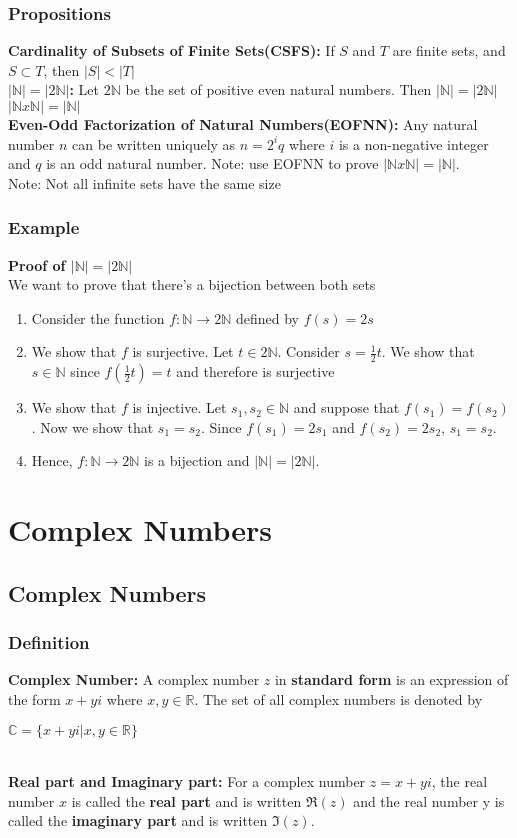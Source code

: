 \documentclass[12pt]{report}
\begin{document}
		\subsection{Propositions}
			\textbf{Cardinality of Subsets of Finite Sets(CSFS):} If $S$ and $T$ are finite sets, and $S \subset T$, then $|S| < |T|$ \\
			\textbf{$|\mathbb{N}| = |2\mathbb{N}|$:} Let $2\mathbb{N}$ be the set of positive even natural numbers. Then $|\mathbb{N}| = |2\mathbb{N}|$\\
			\textbf{$|\mathbb{N} x \mathbb{N}| = |\mathbb{N}|$}\\
			\textbf{Even-Odd Factorization of Natural Numbers(EOFNN):} Any natural number $n$ can be written uniquely as $n = 2^iq$ where $i$ is a non-negative integer and $q$ is an odd natural number.
			Note: use EOFNN to prove $|\mathbb{N} x \mathbb{N}| = |\mathbb{N}|$.\\
			Note: Not all infinite sets have the same size
		\subsection{Example}
			\textbf{Proof of $|\mathbb{N}| = |2\mathbb{N}|$}\\
			We want to prove that there's a bijection between both sets
			\begin{enumerate}
				\item Consider the function $f:\mathbb{N} \rightarrow 2\mathbb{N}$ defined by $f(s) = 2s$
				\item We show that $f$ is surjective. Let $t \in 2\mathbb{N}$. Consider $s = \frac{1}{2}t$. We show that $s \in \mathbb{N}$ since $f(\frac{1}{2}t) = t$ and therefore is surjective
				\item We show that $f$ is injective. Let $s_1, s_2 \in \mathbb{N}$ and suppose that $f(s_1) = f(s_2)$. Now we show that $s_1 = s_2$. Since $f(s_1) = 2s_1$ and $f(s_2) = 2s_2$, $s_1 = s_2$. 
				\item Hence, $f:\mathbb{N} \rightarrow 2\mathbb{N}$ is a bijection and $|\mathbb{N}| = |2\mathbb{N}|$.
			\end{enumerate}
\chapter{Complex Numbers}
	\section{Complex Numbers}
		\subsection{Definition}
			\textbf{Complex Number:} A complex number $z$ in \textbf{standard form} is an expression of the form $x+yi$ where $x,y\in \mathbb{R}$. The set of all complex numbers is denoted by\\
			\centerline{$\mathbb{C} = \{x + yi | x,y \in \mathbb{R}\}$}
			\\
			\textbf{Real part and Imaginary part:} For a complex number $z = x + yi$, the real number $x$ is called the \textbf{real part} and is written $\Re(z)$ and the real number y is called the \textbf{imaginary part} and is written $\Im(z)$.
			\\
\end{document}
